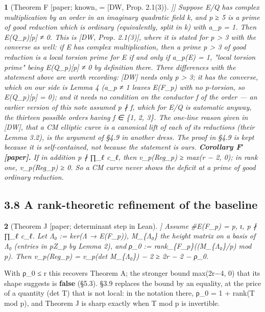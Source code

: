 \documentclass[11pt,a4paper]{article}
\theoremstyle{named}
\newtheorem*{namedthm}{}
\begin{document}
\begin{namedthm}[Theorem F [paper; known, = [DW, Prop. 2.1(3)]]]
Suppose E/Q has complex multiplication by an order in an imaginary quadratic field k, and p ≥ 5 is a prime of good reduction which is ordinary (equivalently, split in k) with a\_p = 1. Then E(Q\_p)[p] ≠ 0.
This is [DW, Prop. 2.1(3)], where it is stated for p \textgreater{} 3 with the converse as well: \textit{if E has complex multiplication, then a prime p \textgreater{} 3 of good reduction is a local torsion prime for E if and only if a\_p(E) = 1}, "local torsion prime" being E(Q\_p)[p] ≠ 0 by definition there. Three differences with the statement above are worth recording: [DW] needs only p \textgreater{} 3; it has the converse, which on our side is Lemma 4 (a\_p ≠ 1 leaves E(F\_p) with no p-torsion, so E(Q\_p)[p] = 0); and it needs no condition on the conductor f of the order — an earlier version of this note assumed p ∤ f, which for E/Q is automatic anyway, the thirteen possible orders having f ∈ \{1, 2, 3\}. The one-line reason given in [DW], that a CM elliptic curve is a canonical lift of each of its reductions (their Lemma 3.2), is the argument of §4.9 in another dress. The proof in §4.9 is kept because it is self-contained, not because the statement is ours.
\textbf{Corollary F′ [paper].} If in addition p ∤ ∏\_ℓ c\_ℓ, then v\_p(Reg\_p) ≥ max(r − 2, 0); in rank one, v\_p(Reg\_p) ≥ 0. So a CM curve never shows the deficit at a prime of good ordinary reduction.
\end{namedthm}

\subsection*{3.8 A rank-theoretic refinement of the baseline}

\begin{namedthm}[Theorem J [paper; determinant step in Lean]]
Assume \#E(F\_p) = p, ι, p ∤ ∏\_ℓ c\_ℓ. Let Λ₀ := ker(Λ → E(F\_p)), M\_\{Λ₀\} the height matrix on a basis of Λ₀ (entries in pZ\_p by Lemma 2), and ρ\_0 := rank\_\{F\_p\}((M\_\{Λ₀\}/p) mod p). Then v\_p(Reg\_p) = v\_p(det M\_\{Λ₀\}) − 2 ≥ 2r − 2 − ρ\_0.
\end{namedthm}

With ρ\_0 ≤ r this recovers Theorem A; the stronger bound max(2r−4, 0) that its shape suggests is \textbf{false} (§5.3). §3.9 replaces the bound by an equality, at the price of a quantity (det T) that is not local: in the notation there, ρ\_0 = 1 + rank(T mod p), and Theorem J is sharp exactly when T mod p is invertible.
\end{document}
